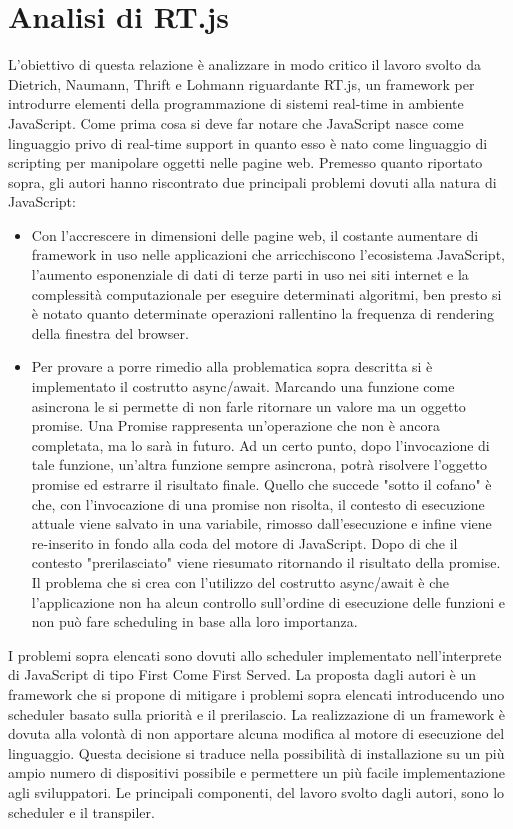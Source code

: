 \documentclass[conference]{IEEEtran}
\begin{document}
\section{Analisi di RT.js}
L'obiettivo di questa relazione è analizzare in modo critico il lavoro svolto da Dietrich, Naumann, Thrift e Lohmann riguardante RT.js, un framework per introdurre elementi della programmazione di sistemi real-time in ambiente JavaScript.
\newline
Come prima cosa si deve far notare che JavaScript nasce come linguaggio privo di real-time support in quanto esso è nato come linguaggio di scripting per manipolare oggetti nelle pagine web.
\newline
Premesso quanto riportato sopra, gli autori hanno riscontrato due principali problemi dovuti alla natura di JavaScript: 
\begin{itemize}
    \item Con l'accrescere in dimensioni delle pagine web, il costante aumentare di framework in uso nelle applicazioni che arricchiscono l'ecosistema JavaScript, l'aumento esponenziale di dati di terze parti in uso nei siti internet e la complessità computazionale per eseguire determinati algoritmi, ben presto si è notato quanto determinate operazioni rallentino la frequenza di rendering della finestra del browser.
    \item Per provare a porre rimedio alla problematica sopra descritta si è implementato il costrutto async/await. Marcando una funzione come asincrona le si permette di non farle ritornare un valore ma un oggetto promise. Una Promise rappresenta un'operazione che non è ancora completata, ma lo sarà in futuro. Ad un certo punto, dopo l'invocazione di tale funzione, un'altra funzione sempre asincrona, potrà risolvere l'oggetto promise ed estrarre il risultato finale. Quello che succede "sotto il cofano" è che, con l'invocazione di una promise non risolta, il contesto di esecuzione attuale viene salvato in una variabile, rimosso dall'esecuzione e infine viene re-inserito in fondo alla coda del motore di JavaScript. Dopo di che il contesto "prerilasciato" viene riesumato ritornando il risultato della promise. Il problema che si crea con l'utilizzo del costrutto async/await è che l'applicazione non ha alcun controllo sull'ordine di esecuzione delle funzioni e non può fare scheduling in base alla loro importanza.
\end{itemize}
I problemi sopra elencati sono dovuti allo scheduler implementato nell'interprete di JavaScript di tipo First Come First Served. La proposta dagli autori è un framework che si propone di mitigare i problemi sopra elencati introducendo uno scheduler basato sulla priorità e il prerilascio. La realizzazione di un framework è dovuta alla volontà di non apportare alcuna modifica al motore di esecuzione del linguaggio. Questa decisione si traduce nella possibilità di installazione su un più ampio numero di dispositivi possibile e permettere un più facile implementazione agli sviluppatori. Le principali componenti, del lavoro svolto dagli autori, sono lo scheduler e il transpiler. 
\end{document}
